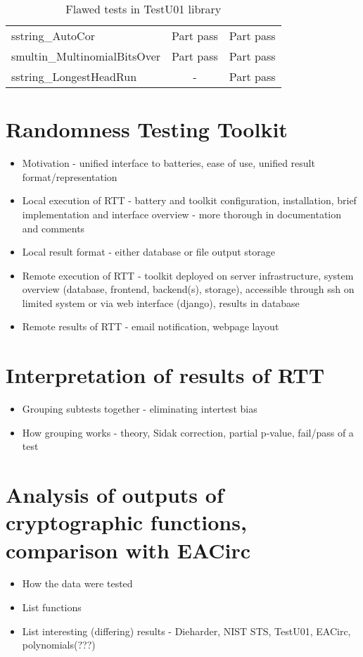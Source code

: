 \documentclass[
  digital,  	%
  color,		%
  oneside,   	%
  12pt,
  nocover,
  notable,
  nolof,
  nolot,
]{fithesis3}
\begin{document}
\begin{table}[h!]
\begin{nomar}
\begin{tabular}{l || c | c }
sstring\_AutoCor                   & Part pass                & Part pass                \\
smultin\_MultinomialBitsOver       & Part pass                & Part pass                \\
sstring\_LongestHeadRun            & -                        & Part pass                \\                                              
\end{tabular}
\end{nomar}  
\caption{Flawed tests in TestU01 library}
\label{tab:testu01-errors}                                                                                           
\end{table}

\chapter{Randomness Testing Toolkit}
\begin{itemize}
\item Motivation - unified interface to batteries, ease of use, unified result format/representation
\item Local execution of RTT - battery and toolkit configuration, installation, brief implementation and interface overview - more thorough in documentation and comments
\item Local result format - either database or file output storage
\item Remote execution of RTT - toolkit deployed on server infrastructure, system overview (database, frontend, backend(s), storage), accessible through ssh on limited system or via web interface (django), results in database
\item Remote results of RTT - email notification, webpage layout
\end{itemize}

\chapter{Interpretation of results of RTT}
\begin{itemize}
\item Grouping subtests together - eliminating intertest bias
\item How grouping works - theory, Sidak correction, partial p-value, fail/pass of a test
\end{itemize}
 
\chapter{Analysis of outputs of cryptographic functions, comparison with EACirc}
\begin{itemize}
\item How the data were tested
\item List functions
\item List interesting (differing) results - Dieharder, NIST STS, TestU01, EACirc, polynomials(???)
\end{itemize}
\end{document}
